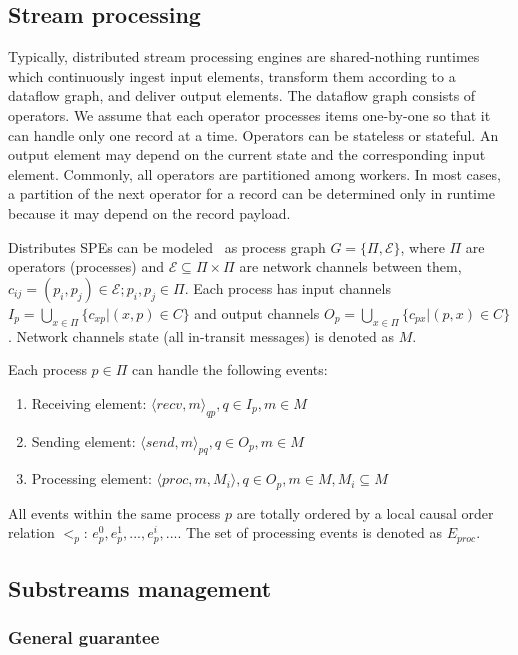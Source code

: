 \label{fs-acker-preliminaries}

\subsection{Stream processing}

Typically, distributed stream processing engines are shared-nothing runtimes which continuously ingest input elements, transform them according to a dataflow graph, and deliver output elements. The dataflow graph consists of operators. We assume that each operator processes items one-by-one so that it can handle only one record at a time. Operators can be stateless or stateful. An output element may depend on the current state and the corresponding input element. Commonly, all operators are partitioned among workers. In most cases, a partition of the next operator for a record can be determined only in runtime because it may depend on the record payload. 

Distributes SPEs can be modeled~\cite{carbone2018scalable} as process graph $G=\{\Pi,\mathcal{E}\}$, where $\Pi$ are operators (processes) and $\mathcal{E} \subseteq \Pi \times \Pi$ are network channels between them, $c_{ij}=(p_i,p_j)\in \mathcal{E}; p_i,p_j \in \Pi$. Each process has input channels $I_p = \bigcup_{x \in \Pi} \{c_{xp} | (x,p) \in C\}$ and output channels $O_p = \bigcup_{x \in \Pi} \{c_{px} | (p,x) \in C\}$. Network channels state (all in-transit messages) is denoted as $M$. 

Each process $p\in \Pi$ can handle the following events:
\begin{enumerate}
    \item Receiving element: $\langle recv,m\rangle_{qp}, q\in I_p, m\in M$
    \item Sending element: $\langle send,m\rangle_{pq}, q\in O_p, m\in M$
    \item Processing element: $\langle proc,m,M_i\rangle, q\in O_p, m\in M, M_i \subseteq M$
\end{enumerate}

All events within the same process $p$ are totally ordered by a local causal order relation $<_p$: $e^{0}_p,e^{1}_p,...,e^{i}_p,...$. The set of processing events is denoted as $E_{proc}$.

\subsection{Substreams management}

\subsubsection{General guarantee}

